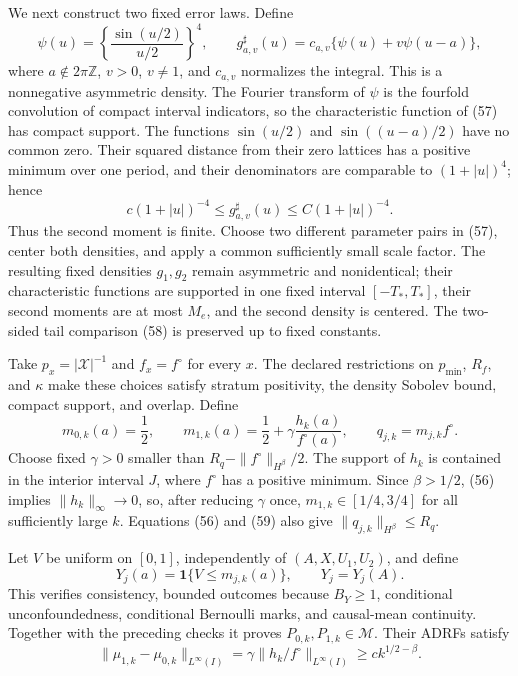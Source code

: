 We next construct two fixed error laws.  Define
\[
\psi(u)=\left\{\frac{\sin(u/2)}{u/2}\right\}^4,
\qquad
g_{a,v}^{\sharp}(u)=c_{a,v}\{\psi(u)+v\psi(u-a)\}, \tag{57}
\]
where \(a\notin2\pi\mathbb Z\), \(v>0\), \(v\ne1\), and \(c_{a,v}\) normalizes the integral.  This is a nonnegative asymmetric density.  The Fourier transform of \(\psi\) is the fourfold convolution of compact interval indicators, so the characteristic function of (57) has compact support.  The functions \(\sin(u/2)\) and \(\sin((u-a)/2)\) have no common zero.  Their squared distance from their zero lattices has a positive minimum over one period, and their denominators are comparable to \((1+|u|)^4\); hence
\[
c(1+|u|)^{-4}\le g_{a,v}^{\sharp}(u)
\le C(1+|u|)^{-4}. \tag{58}
\]
Thus the second moment is finite.  Choose two different parameter pairs in (57), center both densities, and apply a common sufficiently small scale factor.  The resulting fixed densities \(g_1,g_2\) remain asymmetric and nonidentical; their characteristic functions are supported in one fixed interval \([-T_*,T_*]\), their second moments are at most \(M_e\), and the second density is centered.  The two-sided tail comparison (58) is preserved up to fixed constants.

Take \(p_x=|\mathcal X|^{-1}\) and \(f_x=f^\circ\) for every \(x\).  The declared restrictions on \(p_{\min}\), \(R_f\), and \(\kappa\) make these choices satisfy stratum positivity, the density Sobolev bound, compact support, and overlap.  Define
\[
m_{0,k}(a)=\frac12,
\qquad
m_{1,k}(a)=\frac12+\gamma\frac{h_k(a)}{f^\circ(a)},
\qquad
q_{j,k}=m_{j,k}f^\circ. \tag{59}
\]
Choose fixed \(\gamma>0\) smaller than \(R_q-\|f^\circ\|_{H^\beta}/2\).  The support of \(h_k\) is contained in the interior interval \(J\), where \(f^\circ\) has a positive minimum.  Since \(\beta>1/2\), (56) implies \(\|h_k\|_\infty\to0\), so, after reducing \(\gamma\) once, \(m_{1,k}\in[1/4,3/4]\) for all sufficiently large \(k\).  Equations (56) and (59) also give \(\|q_{j,k}\|_{H^\beta}\le R_q\).

Let \(V\) be uniform on \([0,1]\), independently of \((A,X,U_1,U_2)\), and define
\[
Y_j(a)=\mathbf 1\{V\le m_{j,k}(a)\},
\qquad Y_j=Y_j(A).
\]
This verifies consistency, bounded outcomes because \(B_Y\ge1\), conditional unconfoundedness, conditional Bernoulli marks, and causal-mean continuity.  Together with the preceding checks it proves \(P_{0,k},P_{1,k}\in\mathcal M\).  Their ADRFs satisfy
\[
\|\mu_{1,k}-\mu_{0,k}\|_{L^\infty(I)}
=\gamma\|h_k/f^\circ\|_{L^\infty(I)}
\ge ck^{1/2-\beta}. \tag{60}
\]

